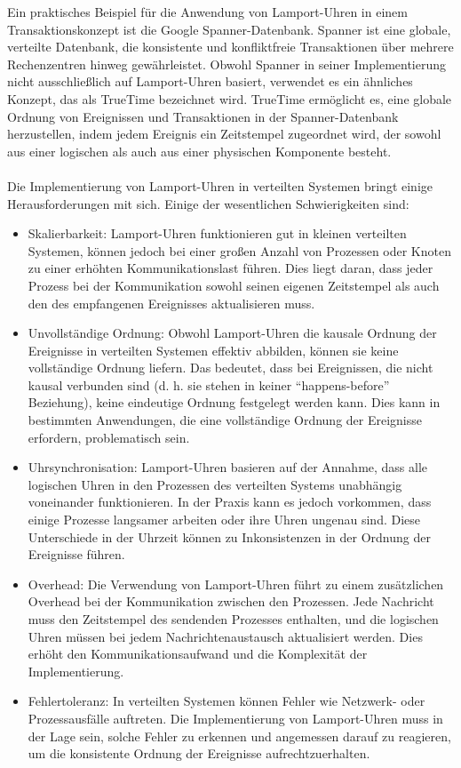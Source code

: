 Ein praktisches Beispiel für die Anwendung von Lamport-Uhren in einem Transaktionskonzept ist die Google Spanner-Datenbank. Spanner ist eine globale, verteilte Datenbank, die konsistente und konfliktfreie Transaktionen über mehrere Rechenzentren hinweg gewährleistet. Obwohl Spanner in seiner Implementierung nicht ausschließlich auf Lamport-Uhren basiert, verwendet es ein ähnliches Konzept, das als TrueTime bezeichnet wird. TrueTime ermöglicht es, eine globale Ordnung von Ereignissen und Transaktionen in der Spanner-Datenbank herzustellen, indem jedem Ereignis ein Zeitstempel zugeordnet wird, der sowohl aus einer logischen als auch aus einer physischen Komponente besteht.
\\\\
Die Implementierung von Lamport-Uhren in verteilten Systemen bringt einige Herausforderungen mit sich. Einige der wesentlichen Schwierigkeiten sind:
\begin{itemize}
\item Skalierbarkeit: Lamport-Uhren funktionieren gut in kleinen verteilten Systemen, können jedoch bei einer großen Anzahl von Prozessen oder Knoten zu einer erhöhten Kommunikationslast führen. Dies liegt daran, dass jeder Prozess bei der Kommunikation sowohl seinen eigenen Zeitstempel als auch den des empfangenen Ereignisses aktualisieren muss.
\item Unvollständige Ordnung: Obwohl Lamport-Uhren die kausale Ordnung der Ereignisse in verteilten Systemen effektiv abbilden, können sie keine vollständige Ordnung liefern. Das bedeutet, dass bei Ereignissen, die nicht kausal verbunden sind (d. h. sie stehen in keiner \enquote{happens-before} Beziehung), keine eindeutige Ordnung festgelegt werden kann. Dies kann in bestimmten Anwendungen, die eine vollständige Ordnung der Ereignisse erfordern, problematisch sein.
\item Uhrsynchronisation: Lamport-Uhren basieren auf der Annahme, dass alle logischen Uhren in den Prozessen des verteilten Systems unabhängig voneinander funktionieren. In der Praxis kann es jedoch vorkommen, dass einige Prozesse langsamer arbeiten oder ihre Uhren ungenau sind. Diese Unterschiede in der Uhrzeit können zu Inkonsistenzen in der Ordnung der Ereignisse führen.
\item Overhead: Die Verwendung von Lamport-Uhren führt zu einem zusätzlichen Overhead bei der Kommunikation zwischen den Prozessen. Jede Nachricht muss den Zeitstempel des sendenden Prozesses enthalten, und die logischen Uhren müssen bei jedem Nachrichtenaustausch aktualisiert werden. Dies erhöht den Kommunikationsaufwand und die Komplexität der Implementierung.
\item Fehlertoleranz: In verteilten Systemen können Fehler wie Netzwerk- oder Prozessausfälle auftreten. Die Implementierung von Lamport-Uhren muss in der Lage sein, solche Fehler zu erkennen und angemessen darauf zu reagieren, um die konsistente Ordnung der Ereignisse aufrechtzuerhalten.
\end{itemize}
